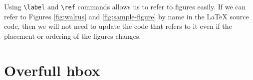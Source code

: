 



Using \verb.\label. and \verb.\ref. commands allows us to refer to
figures easily. If we can refer to Figures
\ref{fig:walrus} and \ref{fig:sample-figure} by name in the {\LaTeX}
source code, then we will not need to update the code that refers to it
even if the placement or ordering of the figures changes.

\loremipsum\loremipsum


\loremipsum\loremipsum\loremipsum

\section{Overfull hbox}

